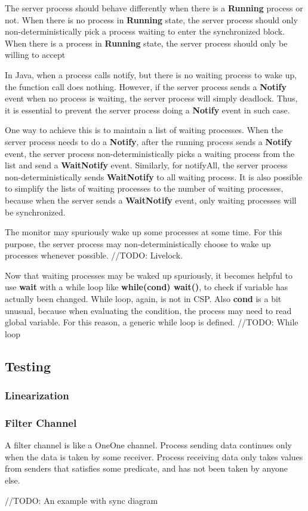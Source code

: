 \documentclass{article}
\begin{document}
The server process should behave differently when there is a \textbf{Running} process or not. When there is no process in \textbf{Running} state, the server process should only non-deterministically pick a process waiting to enter the synchronized block. When there is a process in \textbf{Running} state, the server process should only be willing to accept 

In Java, when a process calls notify, but there is no waiting process to wake up, the function call does nothing. However, if the server process sends a \textbf{Notify} event when no process is waiting, the server process will simply deadlock. Thus, it is essential to prevent the server process doing a \textbf{Notify} event in such case.

One way to achieve this is to maintain a list of waiting processes. When the server process needs to do a \textbf{Notify}, after the running process sends a \textbf{Notify} event, the server process non-deterministically picks a waiting process from the list and send a \textbf{WaitNotify} event. Similarly, for notifyAll, the server process non-deterministically sends \textbf{WaitNotify} to all waiting process. It is also possible to simplify the lists of waiting processes to the number of waiting processes, because when the server sends a \textbf{WaitNotify} event, only waiting processes will be synchronized. 

The monitor may spuriously wake up some processes at some time. For this purpose, the server process may non-deterministically choose to wake up processes whenever possible. //TODO: Livelock.

Now that waiting processes may be waked up spuriously, it becomes helpful to use \textbf{wait} with a while loop like \textbf{while(cond) wait()}, to check if variable has actually been changed. While loop, again, is not in CSP. Also \textbf{cond} is a bit unusual, because when evaluating the condition, the process may need to read global variable. For this reason, a generic while loop is defined. //TODO: While loop

\subsection{Testing}
\subsubsection{Linearization}
\subsubsection{Filter Channel}
A filter channel is like a OneOne channel. Process sending data continues only when the data is taken by some receiver. Process receiving data only takes values from senders that satisfies some predicate, and has not been taken by anyone else. 

//TODO: An example with sync diagram
\end{document}
